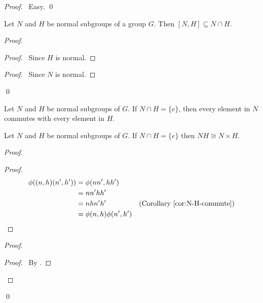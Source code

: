 \begin{proof}
\pf\ Easy. \qed
\end{proof}

\begin{lm}
Let $N$ and $H$ be normal subgroups of a group $G$. Then $[N,H] \subseteq N \cap H$.
\end{lm}

\begin{proof}
\pf
{}
\begin{proof}
	\pf\ Since $H$ is normal.
\end{proof}
\begin{proof}
	\pf\ Since $N$ is normal.
\end{proof}
\qed
\end{proof}

\begin{cor}
\label{cor:N-H-commute}
Let $N$ and $H$ be normal subgroups of $G$. If $N \cap H = \{e\}$, then every element in $N$ commutes with every element in $H$.
\end{cor}

\begin{prop}
\label{prop:NH-cong-N-times-H}
Let $N$ and $H$ be normal subgroups of $G$. If $N \cap H = \{e\}$ then $NH \cong N \times H$.
\end{prop}

\begin{proof}
\pf
{}
\begin{proof}
	\pf
	\begin{align*}
		\phi((n,h)(n',h')) & = \phi(nn',hh') \\
		& = nn'hh' \\
		& = nhn'h' & (\text{Corollary \ref{cor:N-H-commute}}) \\
		& = \phi(n,h)\phi(n',h')
	\end{align*}
\end{proof}
\begin{proof}
	\begin{proof}
		\pf\ By .
	\end{proof}
\end{proof}
\qed
\end{proof}

